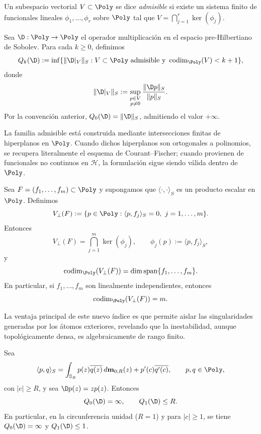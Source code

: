 \begin{defn}\label{def:subespacio_admisible}
	Un subespacio vectorial $V \subset \Poly$ se dice \emph{admisible} si existe un sistema finito de funcionales lineales $\phi_1,\dots,\phi_r$ sobre $\Poly$ tal que $V = \bigcap_{j=1}^r \ker(\phi_j)$.
\end{defn}

\begin{defn}\label{def:indice_Qk}
	Sea $\D:\Poly\to\Poly$ el operador multiplicación en el espacio pre-Hilbertiano de Sobolev. Para cada $k\ge0$, definimos
	\[
		Q_k(\D)
		:=\inf\{\|\D|_V\|_S:V\subset\Poly\ \text{admisible y}\ \operatorname{codim}_{\Poly}(V)<k+1\},
	\]
	donde
	\[
		\|\D|_V\|_S:=\sup_{\substack{p\in V\\p\ne0}}\frac{\|\D p\|_S}{\|p\|_S}.
	\]
	Por la convención anterior, $Q_0(\D)=\|\D\|_S$, admitiendo el valor $+\infty$.
\end{defn}

\begin{rmk}
	La familia admisible está construida mediante intersecciones finitas de hiperplanos en $\Poly$. Cuando dichos hiperplanos son ortogonales a polinomios, se recupera literalmente el esquema de Courant--Fischer; cuando provienen de funcionales no continuos en $\mathcal{H}$, la formulación sigue siendo válida dentro de $\Poly$.
\end{rmk}

\begin{prop}\label{prop:equiv_ortho_interseccion}
	Sea $F=(f_1,\dots,f_m)\subset \Poly$ y supongamos que
	$\langle\cdot,\cdot\rangle_S$ es un producto escalar en $\Poly$.
	Definimos
	\[
		V_{\perp}(F):=\{p\in\Poly:\langle p,f_j\rangle_S=0,\ j=1,\dots,m\}.
	\]
	Entonces
	\[
		V_{\perp}(F)=\bigcap_{j=1}^m \ker(\phi_j),
		\qquad
		\phi_j(p):=\langle p,f_j\rangle_S,
	\]
	y
	\[
		\operatorname{codim}_{\Poly}(V_\perp(F))
		=
		\dim\operatorname{span}\{f_1,\dots,f_m\}.
	\]
	En particular, si $f_1,\dots,f_m$ son linealmente independientes, entonces
	\[
		\operatorname{codim}_{\Poly}(V_\perp(F))=m.
	\]
\end{prop}

La ventaja principal de este nuevo índice es que permite aislar las singularidades generadas por los átomos exteriores, revelando que la inestabilidad, aunque topológicamente densa, es algebraicamente de rango finito.

\begin{prop}
	\label{prop:lebesgue_pre_umbral_Qk}
	Sea
	\[
		\langle p,q\rangle_S
		=
		\int_{\mathbb{S}_R} p(z)\overline{q(z)}\,d\mathbf m_{0;R}(z)
		+
		p'(c)\overline{q'(c)},
		\qquad p,q\in\Poly,
	\]
	con $|c|\ge R$, y sea $\D p(z)=zp(z)$. Entonces
	\[
		Q_0(\D)=\infty,
		\qquad
		Q_1(\D)\le R.
	\]
	En particular, en la circunferencia unidad ($R=1$) y para $|c|\ge1$, se tiene
	$Q_0(\D)=\infty$ y $Q_1(\D)\le1$.
\end{prop}

